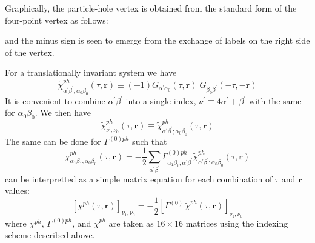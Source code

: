 Graphically, the particle-hole vertex is obtained from
the standard form of the four-point vertex 
as follows:
\begin{center}
\end{center}
and the minus sign is seen to emerge from the exchange of labels
on the right side of the vertex.

For a translationally invariant system we have
\begin{equation}
\tilde{\chi}^{ph}_{\alpha^{\prime}\beta^{\prime}; 
\alpha_0 \beta_0}(\tau,\mathbf{r}) \equiv
(-1) G_{\alpha^{\prime} \alpha_0}(\tau,\mathbf{r}) \; 
G_{\beta_0 \beta^{\prime}}(-\tau,-\mathbf{r})
\end{equation}
It is convenient to combine $\alpha^{\prime}\beta^{\prime}$
into a single index, $\nu^{\prime} \equiv
4 \alpha^{\prime} + \beta^{\prime}$ with the same
for $\alpha_0\beta_0$.  We then have
\begin{equation}
\tilde{\chi}^{ph}_{\nu^{\prime},\nu_0}(\tau,\mathbf{r}) \equiv
\tilde{\chi}^{ph}_{\alpha^{\prime}\beta^{\prime}; 
\alpha_0 \beta_0}(\tau,\mathbf{r})
\end{equation}
The same can be done for $\Gamma^{(0)ph}$ such that
\begin{equation}
\chi^{ph}_{\alpha_1\beta_1,\alpha_0\beta_0}(\tau,\mathbf{r}) 
=-\frac{1}{2} \sum_{\alpha^{\prime}\beta^{\prime}} 
\Gamma^{(0)ph}_{\alpha_1\beta_1;\alpha^{\prime}\beta^{\prime}}
\tilde{\chi}^{ph}_{\alpha^{\prime}\beta^{\prime};\alpha_0\beta_0}
(\tau,\mathbf{r})
\end{equation}
can be interpretted as a simple matrix equation for each combination
of $\tau$ and $\mathbf{r}$ values:
\begin{equation}
\left[\chi^{ph}(\tau,\mathbf{r})\right]_{\nu_1,\nu_0} =
-\frac{1}{2}\left[\Gamma^{(0)}\,\tilde{\chi}^{ph}(\tau,\mathbf{r})\right]_{\nu_1,\nu_0}
\end{equation}
where $\chi^{ph}$, $\Gamma^{(0)ph}$, and $\tilde{\chi}^{ph}$
are taken as $16 \times 16$ matrices using the indexing scheme
described above.

